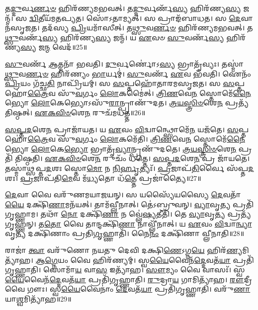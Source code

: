 𑌤\-\ul{𑌦𑍍𑌦𑍁}\-𑌰𑍍𑌵\-\ul{𑌰𑍍𑌣}\-\-\ul{𑍞} 𑌹𑌿𑌰᳴𑌣𑍍𑌯𑌮𑌭𑌵𑌤𑍍।
𑌤\-\ul{𑌦𑍍𑌦𑍁}\-𑌰𑍍𑌵𑌰𑍍𑌣᳴\-\ul{𑌸𑍍𑌯} 𑌹𑌿𑌰᳴𑌣𑍍𑌯\-\ul{𑌸𑍍𑌯} 𑌜𑌨𑍍𑌮᳴।
𑌸 \ul{𑌦𑍍𑌵𑌿}\-𑌤𑍀𑌯᳴𑌮𑌤𑌪𑍍𑌯𑌤।
𑌸𑍋᳴𑌽𑌤𑌾𑌮𑍍𑌯𑌤𑍍।
𑌸 𑌪𑍍𑌰𑌾𑌙᳴𑌬𑌾𑌧𑌤।
𑌸 \ul{𑌦𑍇}\-𑌵𑌾𑌨᳴\-𑌸𑍃𑌜𑌤।
𑌤𑌦᳴𑌸𑍍𑌯 \ul{𑌪𑍍𑌰𑌿}\-𑌯𑌮𑌾᳴𑌸𑍀𑌤𑍍।
𑌤\-\ul{𑌥𑍍𑌸𑍁}\-𑌵\-\ul{𑌰𑍍𑌣}\-\-\ul{𑍞} 𑌹𑌿𑌰᳴𑌣𑍍𑌯𑌮𑌭𑌵𑌤𑍍।
𑌤\-\ul{𑌥𑍍𑌸𑍁}\-𑌵𑌰𑍍𑌣᳴\-\ul{𑌸𑍍𑌯} 𑌹𑌿𑌰᳴𑌣𑍍𑌯\-\ul{𑌸𑍍𑌯} 𑌜𑌨𑍍𑌮᳴।
𑌯 \ul{𑌏}\-𑌵𑍞 \ul{𑌸𑍁}\-𑌵𑌰𑍍𑌣᳴\-\ul{𑌸𑍍𑌯} 𑌹𑌿𑌰᳴𑌣𑍍𑌯\-\ul{𑌸𑍍𑌯} 𑌜\-\ul{𑌨𑍍𑌮} 𑌵𑍇𑌦᳴॥25॥

\-\ul{𑌸𑍁}\-𑌵𑌰𑍍𑌣᳴ \ul{𑌆}\-𑌤𑍍𑌮𑌨𑌾᳴ 𑌭𑌵𑌤𑌿।
\-\ul{𑌦𑍁}\-𑌰𑍍𑌵𑌰𑍍𑌣𑍋॑\-𑌽\-\ul{𑌸𑍍𑌯} 𑌭𑍍𑌰𑌾𑌤𑍃᳴𑌵𑍍𑌯𑌃।
𑌤𑌸𑍍𑌮𑌾॑\-\ul{𑌥𑍍𑌸𑍁}\-𑌵\-\ul{𑌰𑍍𑌣}\-\-\ul{𑍞} 𑌹𑌿𑌰᳴𑌣𑍍𑌯𑌂 \ul{𑌭𑌾}\-𑌰𑍍𑌯𑌮𑍍॑।
\-\ul{𑌸𑍁}\-𑌵𑌰𑍍𑌣᳴ \ul{𑌏}\-𑌵 𑌭᳴𑌵𑌤𑌿।
𑌐𑌨𑌂᳴ \ul{𑌪𑍍𑌰𑌿}\-𑌯𑌂 𑌗᳴𑌚𑍍𑌛\-\ul{𑌤𑌿} 𑌨𑌾𑌪𑍍𑌰𑌿᳴𑌯𑌮𑍍।
𑌸 \ul{𑌸}\-𑌪𑍍𑌤𑌹𑍋᳴𑌤𑌾𑌰𑌮\-𑌸𑍃𑌜𑌤।
𑌸 \ul{𑌸}\-𑌪𑍍𑌤𑌹𑍋॑\-\ul{𑌤𑍍𑌰𑍈}\-𑌵 𑌸𑍁᳴\-\ul{𑌵}\-𑌰𑍍𑌗𑌂 \ul{𑌲𑍋}\-𑌕𑌮𑍈॑𑌤𑍍।
\-\ul{𑌤𑍍𑌰𑌿}\-\-\ul{𑌣}\-𑌵𑍇\-\ul{𑌨} 𑌸𑍍𑌤𑍋𑌮𑍇᳴\-\ul{𑌨𑍈}\-𑌭𑍍𑌯𑍋 \ul{𑌲𑍋}\-𑌕𑍇𑌭𑍍𑌯𑍋\-𑌽𑌸𑍁᳴\-\ul{𑌰𑌾}\-𑌨𑍍𑌪𑍍𑌰𑌾𑌣𑍁᳴𑌦𑌤।
\-\ul{𑌤𑍍𑌰}\-\-\ul{𑌯}\-\-\ul{𑌸𑍍𑌤𑍍𑌰𑌿}\-\-\ul{𑍞}\-𑌶𑍇\-\ul{𑌨} 𑌪𑍍𑌰𑌤𑍍𑌯᳴𑌤𑌿𑌷𑍍𑌠𑌤𑍍।
\-\ul{𑌏}\-\-\ul{𑌕}\-\-\ul{𑌵𑌿}\-\-\ul{𑍞}\-𑌶𑍇\-\ul{𑌨} 𑌰𑍁𑌚᳴𑌮𑌧𑌤𑍍𑌤॥26॥

\-\ul{𑌸}\-\-\ul{𑌪𑍍𑌤}\-\-\ul{𑌦}\-𑌶𑍇\-\ul{𑌨} 𑌪𑍍𑌰𑌾𑌜𑌾᳴𑌯𑌤।
𑌯 \ul{𑌏}\-𑌵𑌂 \ul{𑌵𑌿}\-𑌦𑍍𑌵𑌾𑌨𑍍𑌥𑍍𑌸𑍋𑌮𑍇᳴\-\ul{𑌨} 𑌯𑌜᳴𑌤𑍇।
\-\ul{𑌸}\-𑌪𑍍𑌤𑌹𑍋॑\-\ul{𑌤𑍍𑌰𑍈}\-𑌵 𑌸𑍁᳴\-\ul{𑌵}\-𑌰𑍍𑌗𑌂 \ul{𑌲𑍋}\-𑌕𑌮𑍇᳴𑌤𑌿।
\-\ul{𑌤𑍍𑌰𑌿}\-\-\ul{𑌣}\-𑌵𑍇\-\ul{𑌨} 𑌸𑍍𑌤𑍋𑌮𑍇᳴\-\ul{𑌨𑍈}\-𑌭𑍍𑌯𑍋 \ul{𑌲𑍋}\-𑌕𑍇\-\ul{𑌭𑍍𑌯𑍋} 𑌭𑍍𑌰𑌾𑌤𑍃᳴\-\ul{𑌵𑍍𑌯𑌾}\-𑌨𑍍𑌪𑍍𑌰𑌣𑍁᳴𑌦𑌤𑍇।
\-\ul{𑌤𑍍𑌰}\-\-\ul{𑌯}\-\-\ul{𑌸𑍍𑌤𑍍𑌰𑌿}\-\-\ul{𑍞}\-𑌶𑍇\-\ul{𑌨} 𑌪𑍍𑌰𑌤𑌿᳴ 𑌤𑌿𑌷𑍍𑌠𑌤𑌿।
\-\ul{𑌏}\-\-\ul{𑌕}\-\-\ul{𑌵𑌿}\-\-\ul{𑍞}\-𑌶𑍇\-\ul{𑌨} 𑌰𑍁𑌚𑌂᳴ 𑌧𑌤𑍍𑌤𑍇।
\-\ul{𑌸}\-\-\ul{𑌪𑍍𑌤}\-\-\ul{𑌦}\-𑌶𑍇\-\ul{𑌨} 𑌪𑍍𑌰 𑌜𑌾᳴𑌯𑌤𑍇।
𑌤𑌸𑍍𑌮𑌾॑𑌥𑍍𑌸𑌪𑍍𑌤\-\ul{𑌦}\-𑌶𑌃 𑌸𑍍𑌤𑍋\-\ul{𑌮𑍋} 𑌨 \ul{𑌨𑌿}\-\-\ul{𑌰𑍍}\-𑌹𑍃𑌤𑍍𑌯𑌃᳴।
\-\ul{𑌪𑍍𑌰}\-𑌜𑌾𑌪᳴\-\ul{𑌤𑌿}\-𑌰𑍍𑌵𑍈 𑌸᳴𑌪𑍍𑌤\-\ul{𑌦}\-𑌶𑌃।
\-\ul{𑌪𑍍𑌰}\-𑌜𑌾𑌪᳴𑌤𑌿\-\ul{𑌮𑍇}\-𑌵 𑌮᳴\-\ul{𑌧𑍍𑌯}\-𑌤𑍋 𑌧᳴\-\ul{𑌤𑍍𑌤𑍇} 𑌪𑍍𑌰𑌜𑌾॑𑌤𑍍𑌯𑍈॥27॥\anuvakamend[\-\ul{𑌅}\-\-\ul{𑌨}\-\-\ul{𑌨𑍍𑌦}\-𑌦𑍍𑌭𑍁\-\ul{𑌵} 𑌇\-\ul{𑌤𑌿} 𑌵𑍍𑌯𑌾𑌹᳴\-\ul{𑌰}\-𑌦𑍍𑌵𑍇𑌦𑌾᳴\-\ul{𑌸𑍀}\-𑌦𑍍𑌵𑍇𑌦𑌾᳴𑌧\-\ul{𑌤𑍍𑌤} 𑌪𑍍𑌰𑌜𑌾॑𑌤𑍍𑌯𑍈]

\-\ul{𑌦𑍇}\-𑌵𑌾 𑌵𑍈 𑌵𑌰𑍁᳴𑌣𑌮𑌯𑌾𑌜𑌯𑌨𑍍।
𑌸 𑌯𑌸𑍍𑌯𑍈᳴𑌯𑌸𑍍𑌯𑍈 \ul{𑌦𑍇}\-𑌵𑌤𑌾᳴\-\ul{𑌯𑍈} 𑌦𑌕𑍍𑌷𑌿᳴\-\ul{𑌣𑌾}\-𑌮𑌨᳴𑌯𑌤𑍍।
𑌤𑌾𑌮᳴𑌵𑍍𑌲𑍀𑌨𑌾𑌤𑍍।
𑌤𑍇॑𑌽𑌬𑍍𑌰𑍁𑌵𑌨𑍍।
\-\ul{𑌵𑍍𑌯𑌾}\-𑌵𑍃\-\ul{𑌤𑍍𑌯} 𑌪𑍍𑌰𑌤𑌿᳴\-𑌗𑍃𑌹𑍍𑌣𑌾𑌮।
𑌤𑌥𑌾᳴ \ul{𑌨𑍋} 𑌦𑌕𑍍𑌷𑌿᳴\-\ul{𑌣𑌾} 𑌨 𑌵𑍍𑌲𑍇॑\-\ul{𑌷𑍍𑌯}\-𑌤𑍀𑌤𑌿᳴।
𑌤𑍇 \ul{𑌵𑍍𑌯𑌾}\-𑌵𑍃\-\ul{𑌤𑍍𑌯} 𑌪𑍍𑌰𑌤𑍍𑌯᳴𑌗𑍃𑌹𑍍𑌣𑌨𑍍।
𑌤\-\ul{𑌤𑍋} 𑌵𑍈 𑌤𑌾𑌨𑍍𑌦𑌕𑍍𑌷𑌿᳴\-\ul{𑌣𑌾} 𑌨𑌾𑌵𑍍𑌲𑍀᳴𑌨𑌾𑌤𑍍।
𑌯 \ul{𑌏}\-𑌵𑌂 \ul{𑌵𑌿}\-𑌦𑍍𑌵𑌾\-\ul{𑌨𑍍𑌵𑍍𑌯𑌾}\-𑌵𑍃\-\ul{𑌤𑍍𑌯} 𑌦𑌕𑍍𑌷𑌿᳴𑌣𑌾𑌂 𑌪𑍍𑌰𑌤𑌿\-\ul{𑌗𑍃}\-𑌹𑍍𑌣𑌾𑌤𑌿᳴।
𑌨𑍈\-\ul{𑌨𑌂} 𑌦𑌕𑍍𑌷𑌿᳴𑌣𑌾 𑌵𑍍𑌲𑍀𑌨𑌾𑌤𑌿॥28॥

𑌰𑌾𑌜𑌾॑ \ul{𑌤𑍍𑌵𑌾} 𑌵𑌰𑍁᳴𑌣𑍋 𑌨𑌯𑌤𑍁 𑌦𑍇𑌵𑌿 𑌦𑌕𑍍𑌷𑌿\-\ul{𑌣𑍇}\-\-𑌽𑌗𑍍𑌨\-\ul{𑌯𑍇} 𑌹𑌿𑌰᳴\-\ul{𑌣𑍍𑌯}\-𑌮𑌿𑌤𑍍𑌯𑌾᳴𑌹।
\-\ul{𑌆}\-\-\ul{𑌗𑍍𑌨𑍇}\-𑌯𑌂 𑌵𑍈 𑌹𑌿𑌰᳴𑌣𑍍𑌯𑌮𑍍।
𑌸𑍍𑌵\-\ul{𑌯𑍈}\-𑌵𑍈𑌨᳴\-\ul{𑌦𑍍𑌦𑍇}\-𑌵𑌤᳴\-\ul{𑌯𑌾} 𑌪𑍍𑌰𑌤𑌿᳴\-𑌗𑍃𑌹𑍍𑌣𑌾𑌤𑌿।
𑌸𑍋𑌮𑌾᳴\-\ul{𑌯} 𑌵𑌾\-\ul{𑌸} 𑌇𑌤𑍍𑌯𑌾᳴𑌹।
\-\ul{𑌸𑍗}\-𑌮𑍍𑌯𑌂 𑌵𑍈 𑌵𑌾𑌸𑌃᳴।
𑌸𑍍𑌵\-\ul{𑌯𑍈}\-𑌵𑍈𑌨᳴\-\ul{𑌦𑍍𑌦𑍇}\-𑌵𑌤᳴\-\ul{𑌯𑌾} 𑌪𑍍𑌰𑌤𑌿᳴\-𑌗𑍃𑌹𑍍𑌣𑌾𑌤𑌿।
\-\ul{𑌰𑍁}\-𑌦𑍍𑌰𑌾\-\ul{𑌯} 𑌗𑌾𑌮𑌿𑌤𑍍𑌯𑌾᳴𑌹।
\-\ul{𑌰𑍗}\-𑌦𑍍𑌰𑍀 𑌵𑍈 𑌗𑍗𑌃।
𑌸𑍍𑌵\-\ul{𑌯𑍈}\-𑌵𑍈𑌨𑌾𑌂॑ \ul{𑌦𑍇}\-𑌵𑌤᳴\-\ul{𑌯𑌾} 𑌪𑍍𑌰𑌤𑌿᳴\-𑌗𑍃𑌹𑍍𑌣𑌾𑌤𑌿।
𑌵𑌰𑍁᳴\-\ul{𑌣𑌾}\-𑌯𑌾\-\ul{𑌶𑍍𑌵}\-𑌮𑌿𑌤𑍍𑌯𑌾᳴𑌹॥29॥

